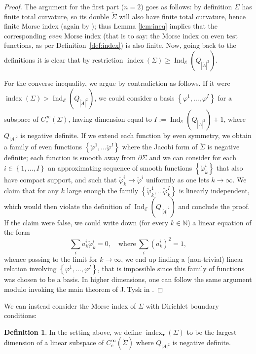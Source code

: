 \documentclass[10pt]{amsart}
\let\mathcal\mathscr
\newcommand{\sbullet}{{\scriptscriptstyle\bullet}}
\DeclareMathOperator{\indx}{index}
\DeclareMathOperator{\Ind}{Ind}
\theoremstyle{definition}
\newtheorem{definition}[thm]{Definition}
\begin{document}
\begin{proof}
The argument for the first part ($n=2$) goes as follows: by definition $\Sigma$ has finite total curvature, so its double $\check{\Sigma}$ will also have finite total curvature, hence finite Morse index (again by \cite{FC85}); thus Lemma \ref{lem:ineq} implies that the corresponding \emph{even} Morse index (that is to say: the Morse index on even test functions, as per Definition~\ref{def:index}) is also finite. Now, going back to the definitions it is clear that by restriction $\indx(\Sigma)\geq \Ind_{\mathcal{E}}(Q_{|\check{A}|^2})$.

For the converse inequality, we argue by contradiction as follows. If it were $\indx(\Sigma)> \Ind_{\mathcal{E}}(Q_{|\check{A}|^2})$, we could consider a basis $\left\{\varphi^1,\ldots, \varphi^I\right\}$ for a subspace of $C^{\infty}_c(\Sigma)$, having dimension equal to $I:=\Ind_{\mathcal{E}}(Q_{|\check{A}|^2})+1$, where $Q_{|A|^2}$ is negative definite.
If we extend each function by even symmetry, we obtain a family of even functions $\left\{\check{\varphi}^1,\ldots \check{\varphi}^I\right\}$ where the Jacobi form of $\check{\Sigma}$ is negative definite; each function is smooth away from $\partial\Sigma$ and we can consider for each $i\in\left\{1,\ldots, I\right\}$ an approximating sequence of smooth functions $\left\{\check{\varphi}^i_k\right\}$ that also have compact support, and such that $\check{\varphi}^i_k\to\check{\varphi}^i$ uniformly as one lets $k\to\infty$.
We claim that for any $k$ large enough the family $\left\{\check{\varphi}^1_k,\ldots \check{\varphi}^I_k\right\}$ is linearly independent, which would then violate the definition of $\Ind_{\mathcal{E}}(Q_{|\check{A}|^2})$ and conclude the proof.
If the claim were false, we could write down (for every $k\in\mathbb{N}$) a linear equation of the form
\[
\sum_i a^i_k \check{\varphi}^i_k=0, \quad \text{where} \ \sum_i (a^i_k)^2=1,
\]
whence passing to the limit for $k\to\infty$, we end up finding a (non-trivial) linear relation involving
$\left\{\varphi^1,\ldots, \varphi^I\right\}$, that is impossible since this family of functions was chosen to be a basis.
In higher dimensions, one can follow the same argument modulo invoking the main theorem of J.\,Tysk in \cite{T89}.
\end{proof}

We can instead consider the Morse index of $\Sigma$ with Dirichlet boundary conditions:

\begin{definition} In the setting above, we define
$\indx_{\sbullet} (\Sigma)$ to be the largest dimension of a linear subspace of $C^{\infty}_c(\mathring{\Sigma})$ where $Q_{|A|^2}$ is negative definite.
\end{definition}
\end{document}
